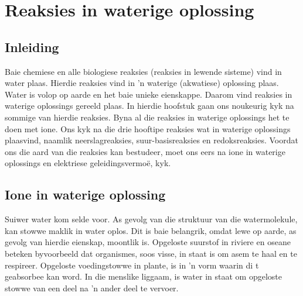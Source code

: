          \chapter{Reaksies in waterige oplossing}
    \setcounter{figure}{1}
    \setcounter{subfigure}{1}
    \label{4c7ba3bfe702f176850b0d58ba743465}
         \section{Inleiding}
    \nopagebreak

\label{m38720*eip-56}
Baie chemiese en alle biologiese reaksies (reaksies in lewende sisteme) vind in water plaas. Hierdie reaksies vind in   'n waterige (akwatiese) oplossing plaas.  Water is volop op aarde en het baie unieke eienskappe. Daarom vind reaksies in waterige oplossings gereeld plaas. In hierdie hoofstuk gaan ons noukeurig kyk na sommige van hierdie reaksies. Byna al die reaksies in waterige oplossings het te doen met ione.  Ons kyk na die drie hooftipe reaksies wat in waterige oplossings plaasvind, naamlik neerslagreaksies, suur-basisreaksies en redoksreaksies. Voordat ons die aard van die reaksies kan bestudeer, moet ons eers na ione in waterige oplossings en elektriese geleidingsvermo\"{e}, kyk.
\label{m38720*cid6}
            \section{Ione in waterige oplossing}
            \nopagebreak
Suiwer water kom selde voor.  As gevolg van die struktuur van die watermolekule, kan stowwe maklik in water oplos.  Dit is baie belangrik, omdat lewe op aarde, as gevolg van hierdie eienskap, moontlik is.  Opgeloste suurstof in riviere en oseane beteken byvoorbeeld dat organismes, soos visse, in staat is om asem te haal en te respireer.  Opgeloste voedingstowwe in plante, is in   'n vorm waarin di t geabsorbee kan word.  In die menslike liggaam, is water in staat om opgeloste stowwe van een deel na   'n ander deel te vervoer. 
      \label{m38720*uid19}
